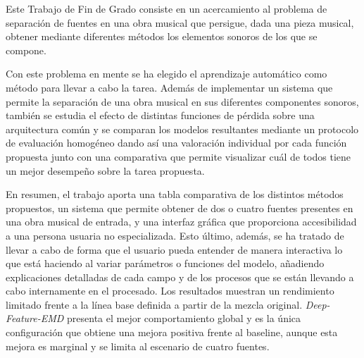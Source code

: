 Este Trabajo de Fin de Grado consiste en un acercamiento al problema de separación de fuentes en una obra musical que persigue, dada una pieza musical, obtener mediante diferentes métodos los elementos sonoros de los que se compone.

Con este problema en mente se ha elegido el aprendizaje automático como método para llevar a cabo la tarea.
Además de implementar un sistema que permite la separación de una obra musical en sus diferentes componentes sonoros, también se estudia el efecto de distintas funciones de pérdida sobre una arquitectura común y se comparan los modelos resultantes mediante un protocolo de evaluación homogéneo dando así una valoración individual por cada función propuesta junto con una comparativa que permite visualizar cuál de todos tiene un mejor desempeño sobre la tarea propuesta.

En resumen, el trabajo aporta una tabla comparativa de los distintos métodos propuestos, un sistema que permite obtener de dos o cuatro fuentes presentes en una obra musical de entrada,
 y una interfaz gráfica que proporciona accesibilidad a una persona usuaria no especializada. Esto último, además, se ha tratado de llevar a cabo de forma que el usuario pueda entender de manera interactiva lo que está haciendo al variar parámetros o funciones del modelo, añadiendo explicaciones detalladas de cada campo y de los procesos que se están llevando a cabo internamente en el procesado.  
Los resultados muestran un rendimiento limitado frente a la línea base definida a partir de la mezcla original. \textit{Deep-Feature-EMD} presenta el mejor comportamiento global y es la única configuración que obtiene una mejora positiva frente al baseline, aunque esta mejora es marginal y se limita al escenario de cuatro fuentes.